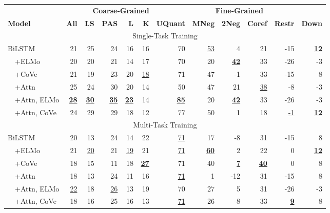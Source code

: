 \documentclass{article} \usepackage{iclr2019_conference,times}
\begin{document}
\begin{table*}[t]
\centering \fontsize{8.4}{10.1}\selectfont \setlength{\tabcolsep}{0.5em}
\begin{tabular}{lr@{\hskip 3em}rrrr@{\hskip 3em}rrrrrr}
 \toprule
 && \multicolumn{4}{l}{\textbf{~~Coarse-Grained}} & \multicolumn{6}{c}{\textbf{Fine-Grained}}\\ \textbf{Model} & \textbf{All} & \textbf{LS} & \textbf{PAS} & \textbf{L} & \textbf{K} & \textbf{UQuant} & \textbf{MNeg} & \textbf{2Neg} & \textbf{Coref} & \textbf{Restr} & \textbf{Down} \\
\midrule
\multicolumn{12}{c}{Single-Task Training} \\
\midrule
BiLSTM & 21 & 25 & 24 & 16 & 16 & 70 & \underline{53} & 4 & 21 & -15 & \textbf{\underline{12}} \\
~~+ELMo & 20 & 20 & 21 & 14 & 17 & 70 & 20 & \textbf{\underline{42}} & 33 & -26 & -3 \\
~~+CoVe & 21 & 19 & 23 & 20 & \underline{18} & 71 & 47 & -1 & 33 & -15 & 8 \\
~~+Attn & 25 & 24 & 30 & 20 & 14 & 50 & 47 & 21 & \underline{38} & -8 & -3 \\
~~+Attn, ELMo & \textbf{\underline{28}} & \textbf{\underline{30}} & \textbf{\underline{35}} & \textbf{\underline{23}} & 14 & \textbf{\underline{85}} & 20 & \textbf{\underline{42}} & 33 & -26 & -3 \\
~~+Attn, CoVe & 24 & 29 & 29 & 18 & 12 & 77 & 50 & 1 & 18 & \underline{-1} & \textbf{\underline{12}} \\

\midrule
\multicolumn{12}{c}{Multi-Task Training} \\
\midrule


BiLSTM & 20 & 13 & 24 & 14 & 22 & \underline{71} & 17 & -8 & 31 & -15 & 8 \\
~~+ELMo & 21 & \underline{20} & 21 & \underline{19} & 21 & \underline{71} & \textbf{\underline{60}} & 2 & 22 & 0 & \textbf{\underline{12}} \\
~~+CoVe & 18 & 15 & 11 & 18 & \textbf{\underline{27}} & 71 & 40 & \underline{7} & \textbf{\underline{40}} & 0 & 8 \\
~~+Attn & 18 & 13 & 24 & 11 & 16 & \underline{71} & 1 & -12 & 31 & -15 & 8 \\
~~+Attn, ELMo & \underline{22} & 18 & \underline{26} & 13 & 19 & 70 & 27 & 5 & 31 & -26 & -3 \\
~~+Attn, CoVe & 18 & 16 & 25 & 16 & 13 & \underline{71} & 26 & -8 & 33 & \textbf{\underline{9}} & 8 \\


\end{tabular}
\end{table*}
\end{document}
